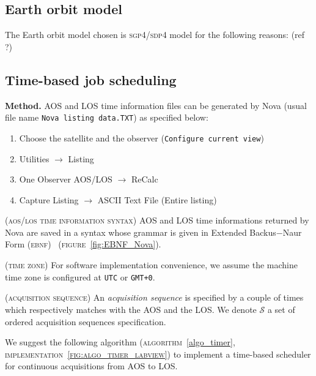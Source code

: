 \documentclass[twocolumn,pre,floats,aps,amsmath,amssymb]{revtex4}
\newenvironment{definition}[1][D\'efinition.]{\begin{trivlist}
\item[\hskip \labelsep {\bfseries #1}]}{\end{trivlist}}
\newenvironment{remark}[1][Remarque.]{\begin{trivlist}
\item[\hskip \labelsep {\bfseries #1}]}{\end{trivlist}}
\begin{document}
\subsection {Earth orbit model}

The Earth orbit model chosen is \textsc{sgp4/sdp4} model for the following reasons: (ref ?)

\subsection {Time-based job scheduling}

\textbf{Method.}
AOS and LOS time information files can be generated by Nova (usual file name \texttt{Nova listing data.TXT}) as specified below:
\begin{enumerate}
\item {Choose the satellite and the observer (\texttt{Configure current view})}
\item {\textup{Utilities} $\rightarrow$ \textup{Listing}}
\item {\textup{One Observer AOS/LOS} $\rightarrow$ \textup{ReCalc}}
\item {\textup{Capture Listing} $\rightarrow$ \textup{ASCII Text File} (Entire listing)}
\end{enumerate}

\begin{remark}
  { \color{rltred}{\Radioactivity} }
  \textsc{(aos/los time information syntax)}
  AOS and LOS time informations returned by Nova are saved in a syntax whose grammar is given in Extended Backus$-$Naur Form (\textsc{ebnf})~\cite{EBNF} (\textsc{figure}~\ref{fig:EBNF_Nova}).
\end{remark}

\begin{remark}
  \textsc{(time zone)}
  For software implementation convenience, we assume the machine time zone is configured at \texttt{UTC} or \texttt{GMT+0}.
\end{remark}

\begin{definition}
  { \color{rltred}{\Radioactivity} }
  \textsc{(acquisition sequence)}
  An \textit{acquisition sequence} is specified by a couple of times which respectively matches with the AOS and the LOS. We denote $\mathcal{S}$ a set of ordered acquisition sequences specification.
\end{definition}

We suggest the following algorithm (\textsc{algorithm}~\ref{algo_timer}, \textsc{implementation~\ref{fig:algo_timer_labview}}) to implement a time-based scheduler for continuous acquisitions from AOS to LOS.
\end{document}
